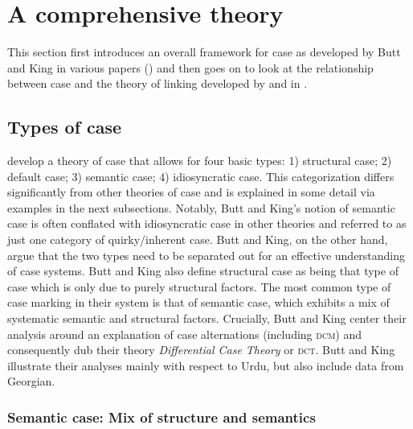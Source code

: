 \documentclass[output=paper,hidelinks]{langscibook}
\begin{document}


\newpage
\section{A comprehensive theory}
\label{sec:all}
\largerpage[2]

This section first introduces an overall framework for case as developed by Butt and
King in various papers () and then goes on to look at the
relationship between case and the theory of linking developed by
\citet{schaetzle18} and \citet{beck-butt2021} in .


\subsection{Types of case}
  \label{sec:types}

  \citet{buttking03-case,buttking05} develop a theory of case that allows for
  four basic types: 1) structural case; 2) default case; 3) semantic case; 4)
  idiosyncratic case.  This categorization differs significantly
  from other theories of case and is explained in some detail
  via examples in the next subsections.  Notably, Butt and King's notion of
  semantic case is often conflated with idiosyncratic case in other theories and
  referred to as just one category of quirky/inherent case.  Butt and King, on
  the other hand, argue that the two types need to be separated out for an
  effective understanding of case systems.  Butt and King also define structural case as
   being that type of case which is only due to purely structural factors.  The
  most common type of case marking in their system is that of semantic case,
  which exhibits a mix of systematic semantic and structural factors.
  Crucially, Butt and King center their analysis around an explanation of case
  alternations (including \textsc{dcm}) and consequently dub their theory
  \textit{Differential Case Theory} or \textsc{dct}. 
Butt and King illustrate their analyses mainly with respect to Urdu, but also
  include data from Georgian.

\subsubsection{Semantic case: Mix of structure and semantics}
\end{document}
